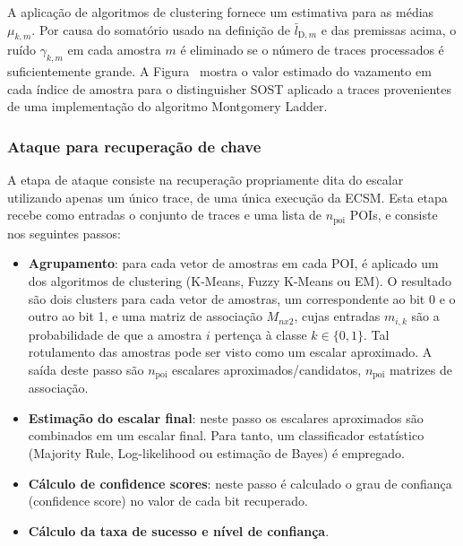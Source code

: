 A aplicação de algoritmos de clustering fornece um estimativa para as médias $\mu_{k,m}$. Por causa do somatório usado na definição de $\bar{l}_{\text{D}, m}$ e das premissas acima, o ruído $\gamma_{k,m}$ em cada amostra $m$ é eliminado se o número de traces processados é suficientemente grande. A Figura~ mostra o valor estimado do vazamento em cada índice de amostra para o distinguisher SOST aplicado a traces provenientes de uma implementação do algoritmo Montgomery Ladder.

\subsubsection{Ataque para recuperação de chave}

A etapa de ataque consiste na recuperação propriamente dita do escalar utilizando apenas um único trace, 
de uma única execução da ECSM. Esta etapa recebe como entradas o conjunto de traces e uma lista de $n_{\mathrm{poi}}$ POIs, e consiste nos seguintes passos:
\begin{itemize}
	\item \textbf{Agrupamento}: para cada vetor de amostras em cada POI, é aplicado um dos algoritmos de clustering (K-Means, Fuzzy K-Means ou EM). O resultado são dois clusters para cada vetor de amostras, um correspondente ao bit 0 e o outro ao bit 1, e uma matriz de associação $M_{nx2}$, cujas entradas $m_{i,k}$ são a probabilidade de que a amostra $i$ pertença à classe $k\in \{0,1\}$. Tal rotulamento das amostras pode ser visto como um escalar aproximado. A saída deste passo são $n_{\mathrm{poi}}$ escalares aproximados/candidatos, $n_{\mathrm{poi}}$ matrizes de associação.
	
	\item \textbf{Estimação do escalar final}: neste passo os escalares aproximados são combinados em um escalar final. Para tanto, um classificador estatístico (Majority Rule, Log-likelihood ou estimação de Bayes) é empregado.
	
	\item \textbf{Cálculo de confidence scores}: neste passo é calculado o grau de confiança (confidence score) no valor de cada bit recuperado.
	
	\item \textbf{Cálculo da taxa de sucesso e nível de confiança}.
\end{itemize}

